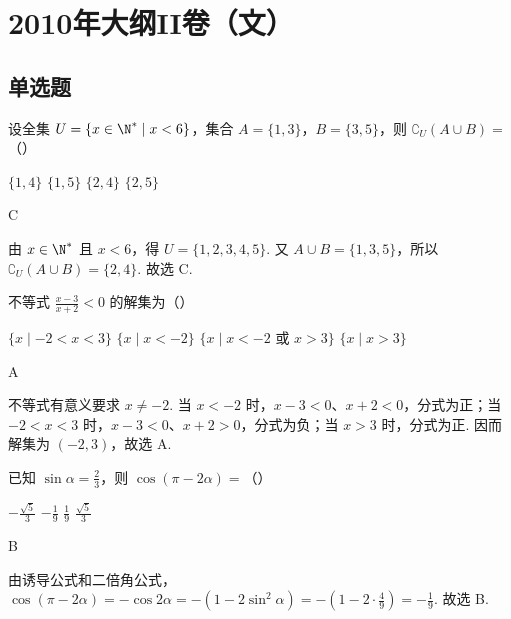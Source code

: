 \chapter{2010年大纲II卷（文）}

\section{单选题}

\begin{problem}
设全集 \(U = \{x \in \N^* \mid x < 6\}\)，集合 \(A = \{1, 3\}\)，\(B = \{3, 5\}\)，则 \(\complement_U\left( A \cup B \right) =\)（\quad）

\choices
    {\(\{1, 4\}\)}
    {\(\{1, 5\}\)}
    {\(\{2, 4\}\)}
    {\(\{2,5\}\)}

\begin{answer}
C
\end{answer}

\begin{solution}
由 \(x\in\N^*\) 且 \(x<6\)，得 \(U=\{1,2,3,4,5\}\). 又 \(A\cup B=\{1,3,5\}\)，所以 \(\complement_U\left(A\cup B\right)=\{2,4\}\). 故选 C.
\end{solution}
\end{problem}

\begin{problem}
不等式 \(\frac{x - 3}{x + 2} < 0\) 的解集为（\quad）

\choices
    {\(\{x \mid -2 < x < 3\}\)}
    {\(\{x \mid x < -2\}\)}
    {\(\{x \mid x < -2 \text{ 或 } x > 3\}\)}
    {\(\{x \mid x > 3\}\)}

\begin{answer}
A
\end{answer}

\begin{solution}
不等式有意义要求 \(x\ne-2\). 当 \(x<-2\) 时，\(x-3<0\)、\(x+2<0\)，分式为正；当 \(-2<x<3\) 时，\(x-3<0\)、\(x+2>0\)，分式为负；当 \(x>3\) 时，分式为正. 因而解集为 \((-2,3)\)，故选 A.
\end{solution}
\end{problem}

\begin{problem}
已知 \(\sin \alpha = \frac{2}{3}\)，则 \(\cos\left(\pi - 2\alpha\right) =\)（\quad）

\choices
    {\(-\frac{\sqrt{5}}{3}\)}
    {\(-\frac{1}{9}\)}
    {\(\frac{1}{9}\)}
    {\(\frac{\sqrt{5}}{3}\)}

\begin{answer}
B
\end{answer}

\begin{solution}
由诱导公式和二倍角公式，\(\cos\left(\pi-2\alpha\right)=-\cos 2\alpha=-(1-2\sin^2\alpha)=-(1-2\cdot\frac{4}{9})=-\frac{1}{9}\). 故选 B.
\end{solution}
\end{problem}

